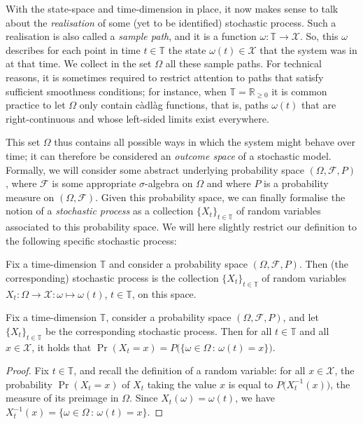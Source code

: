 \documentclass[graybox]{svmult}
\newcommand{\reals}{\mathbb{R}}
\newcommand{\realsnonneg}{\reals_{\geq 0}}
\newcommand{\states}{\mathcal{X}}
\newcommand{\timedim}{\mathbb{T}}
\begin{document}
With the state-space and time-dimension in place, it now makes sense to talk about the \emph{realisation} of some (yet to be identified) stochastic process. Such a realisation is also called a \emph{sample path}, and it is a function $\omega:\timedim\to\states$. So, this $\omega$ describes for each point in time $t\in\timedim$ the state $\omega(t)\in\states$ that the system was in at that time. We collect in the set $\Omega$ all these sample paths. For technical reasons, it is sometimes required to restrict attention to paths that satisfy sufficient smoothness conditions; for instance, when $\timedim=\realsnonneg$ it is common practice to let $\Omega$ only contain c\`adl\`ag functions, that is, paths $\omega(t)$ that are right-continuous and whose left-sided limits exist everywhere.

This set $\Omega$ thus contains all possible ways in which the system might behave over time; it can therefore be considered an \emph{outcome space} of a stochastic model. Formally, we will consider some abstract underlying probability space $(\Omega,\mathcal{F},P)$, where $\mathcal{F}$ is some appropriate $\sigma$-algebra on $\Omega$ and where $P$ is a probability measure on $(\Omega,\mathcal{F})$. Given this probability space, we can finally formalise the notion of a \emph{stochastic process} as a collection $\{X_t\}_{t\in\timedim}$ of random variables associated to this probability space. We will here slightly restrict our definition to the following specific stochastic process:
\begin{definition}\label{def:stochastic_process}
Fix a time-dimension $\timedim$ and consider a probability space $(\Omega,\mathcal{F},P)$. Then (the corresponding) stochastic process is the collection $\{X_t\}_{t\in\timedim}$ of random variables $X_t:\Omega\to\states:\omega\mapsto\omega(t)$, $t\in\timedim$, on this space.
\end{definition}
\begin{corollary}\label{cor:process_prob_is_measure}
Fix a time-dimension $\timedim$, consider a probability space $(\Omega,\mathcal{F},P)$, and let $\{X_t\}_{t\in\timedim}$ be the corresponding stochastic process. Then for all $t\in\timedim$ and all $x\in\states$, it holds that $\Pr(X_t=x) = P\bigl( \{\omega\in\Omega\,:\,\omega(t)=x\} \bigr)$.
\end{corollary}
\begin{proof}
Fix $t\in\timedim$, and recall the definition of a random variable: for all $x\in\states$, the probability $\Pr(X_t=x)$ of $X_t$ taking the value $x$ is equal to $P\bigl(X_t^{-1}(x)\bigr)$, the measure of its preimage in $\Omega$. Since $X_t(\omega)=\omega(t)$, we have $X_t^{-1}(x)=\{\omega\in\Omega\,:\,\omega(t)=x\}$.
\end{proof}
\end{document}
